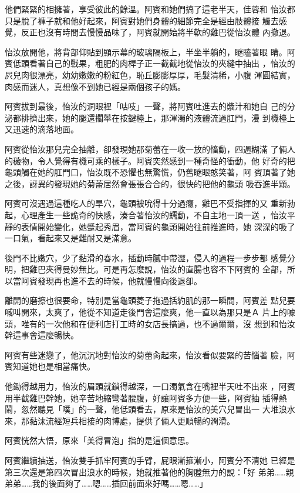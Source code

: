 他們緊緊的相擁著，享受彼此的餘溫。阿賓和她們搞了這老半天，佳蓉和
怡汝都只是脫了褲子就和他好起來，阿賓對她們身體的細節完全是經由肢體接
觸去感覺，反正也沒有時間去慢慢品味了，阿賓就開始將半軟的雞巴從怡汝體
內撤退。

怡汝放開他，將背部仰貼到顯示幕的玻璃隔板上，半坐半躺的，瞇瞌著眼
睛。阿賓低頭看著自己的戰果，粗肥的肉桿子正一截截地從怡汝的夾縫中抽出
，怡汝的屄兒肉很漂亮，幼幼嫩嫩的粉紅色，恥丘膨膨厚厚，毛髮清稀，小腹
渾圓結實，肉感而迷人，真想像不到她已經是兩個孩子的媽。

阿賓拔到最後，怡汝的洞眼裡「咕吱」一聲，將阿賓吐進去的漿汁和她自
己的分泌都排擠出來，她的腿還擱舉在按鍵檯上，那渾濁的液體流過肛門，漫
到機檯上又迅速的滴落地面。

阿賓從怡汝那兒完全抽離，卻發現她那菊蕾在一收一放的慉動，四週糊滿
了倆人的穢物，令人覺得有機可乘的樣子。阿賓突然感到一種奇怪的衝動，他
好奇的把龜頭觸在她的肛門口，怡汝既不恐懼也無驚慌，仍舊瞇眼憨笑著，阿
賓頂著了她之後，訝異的發現她的菊蕾居然會張張合合的，很快的把他的龜頭
吸吞進半顆。

阿賓可沒遇過這種吃人的旱穴，龜頭被吮得十分過癮，雞巴不受指揮的又
重新勃起，心理產生一些詭奇的快感，湊合著怡汝的蠕動，不自主地一頂一送
，怡汝平靜的表情開始變化，她蹙起秀眉，當阿賓的龜頭開始往前推進時，她
深深的吸了一口氣，看起來又是難耐又是滿意。

後門不比嫩穴，少了黏滑的春水，插動時膩中帶澀，侵入的過程一步步都
感覺分明，把雞巴夾得曼妙無比。可是再怎麼說，怡汝的直腸也容不下阿賓的
全部，所以當阿賓發現再也進不去的時候，他就慢慢向後退卻。

離開的磨擦也很要命，特別是當龜頭菱子拖過括約肌的那一瞬間，阿賓差
點兒要喊叫開來，太爽了，他從不知道走後門會這麼爽，他一直以為那只是Ａ
片上的噱頭，唯有的一次他和在便利店打工時的女店長搞過，也不過爾爾，沒
想到和怡汝幹這事會這麼暢快。

阿賓有些迷戀了，他沉沉地對怡汝的菊蕾肏起來，怡汝看似要緊的苦惱著
臉，阿賓知道她也是相當痛快。

他鋤得越用力，怡汝的眉頭就鎖得越深，一口濁氣含在嘴裡半天吐不出來
，阿賓用半截雞巴幹她，她辛苦地縮彎著腰腹，好讓阿賓多方便一些，阿賓抽
插得熱鬧，忽然聽見「噗」的一聲，他低頭看去，原來是怡汝的美穴兒冒出一
大堆浪水來，那黏沫流經短兵相接的肉博處，提供了倆人更順暢的潤滑。

阿賓恍然大悟，原來「美得冒泡」指的是這個意思。

阿賓繼續抽送，怡汝雙手抓牢阿賓的手臂，屁眼漸箍漸小，阿賓分不清她
已經是第三次還是第四次冒出浪水的時候，她就推著他的胸膛無力的說：「好
弟弟……親弟弟……我的後面夠了……嗯……插回前面來好嗎……嗯……」

